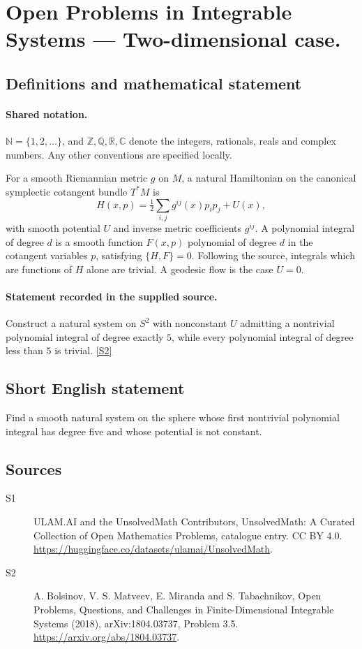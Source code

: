 \documentclass[11pt]{article}
\newcommand{\sref}[2]{\hyperlink{source:#1:#2}{[S#2]}}
\begin{document}
\section{Open Problems in Integrable Systems — Two-dimensional case.}\label{statement}

\subsection{Definitions and mathematical statement}

\paragraph{Shared notation.}$\mathbb N=\{1,2,\ldots\}$, and $\mathbb Z,\mathbb Q,\mathbb R,\mathbb C$ denote the integers, rationals, reals and complex numbers. Any other conventions are specified locally.


For a smooth Riemannian metric $g$ on $M$, a natural Hamiltonian on the canonical symplectic cotangent bundle $T^*M$ is \[H(x,p)=\tfrac12\sum_{i,j}g^{ij}(x)p_ip_j+U(x),\] with smooth potential $U$ and inverse metric coefficients $g^{ij}$. A polynomial integral of degree $d$ is a smooth function $F(x,p)$ polynomial of degree $d$ in the cotangent variables $p$, satisfying $\{H,F\}=0$. Following the source, integrals which are functions of $H$ alone are trivial. A geodesic flow is the case $U=0$.
\paragraph{Statement recorded in the supplied source.}
Construct a natural system on $S^2$ with nonconstant $U$ admitting a nontrivial polynomial integral of degree exactly $5$, while every polynomial integral of degree less than $5$ is trivial. \sref{statement}{2}
\subsection{Short English statement}
Find a smooth natural system on the sphere whose first nontrivial polynomial integral has degree five and whose potential is not constant.
\subsection{Sources}
\begin{description}
\item[\hypertarget{source:statement:1}{S1}] ULAM.AI and the UnsolvedMath Contributors, UnsolvedMath: A Curated Collection of Open Mathematics Problems, catalogue entry. CC BY 4.0. \url{https://huggingface.co/datasets/ulamai/UnsolvedMath}.
\item[\hypertarget{source:statement:2}{S2}] A. Bolsinov, V. S. Matveev, E. Miranda and S. Tabachnikov, Open Problems, Questions, and Challenges in Finite-Dimensional Integrable Systems (2018), arXiv:1804.03737, Problem 3.5. \url{https://arxiv.org/abs/1804.03737}.
\end{description}
\label{end:statement}
\end{document}
